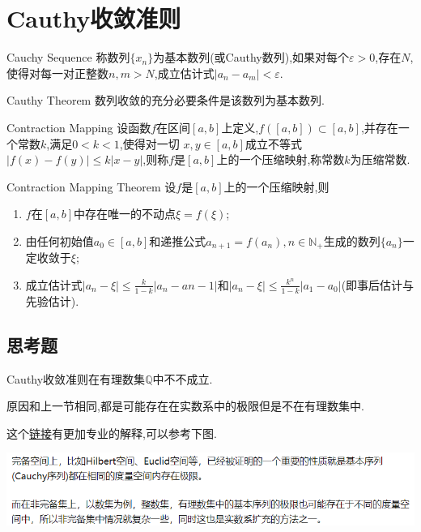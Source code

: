 
\section{Cauthy收敛准则}

 \begin{definition}[基本数列]{Cauchy Sequence}
     称数列$\{x_n\}$为基本数列(或Cauthy数列),如果对每个$\varepsilon>0$,存在$N$,使得对每一对正整数$n,m>N$,成立估计式$\lvert a_n-a_m\rvert<\varepsilon$.
 \end{definition}

 \begin{theorem}[Cauthy收敛准则]{Cauthy Theorem}
     数列收敛的充分必要条件是该数列为基本数列.
 \end{theorem}

 \begin{definition}[压缩映射]{Contraction Mapping}
     设函数$f$在区间$[a,b]$上定义,$f([a,b])\subset [a,b]$,并存在一个常数$k$,满足$0<k<1$,使得对一切 $x,y\in [a,b]$成立不等式$\lvert f(x)-f(y)\rvert\leqslant k\lvert x-y\rvert$,则称$f$是$[a,b]$上的一个压缩映射,称常数$k$为压缩常数.
 \end{definition}
 \begin{theorem}[压缩映射原理]{Contraction Mapping Theorem}
     设$f$是$[a,b]$上的一个压缩映射,则
     \begin{enumerate}
         \item $f$在$[a,b]$中存在唯一的不动点$\xi=f(\xi)$;
         \item 由任何初始值$a_0\in[a,b]$和递推公式$a_{n+1}=f(a_n),n\in \mathbb{N}_+$生成的数列$\{a_n\}$一定收敛于$\xi$;
         \item 成立估计式$\lvert a_n-\xi\rvert\leqslant\frac{k}{1-k}\lvert a_n-a{n-1}\rvert$和$\lvert a_n-\xi\rvert\leqslant\frac{k^n}{1-k}\lvert a_1-a_0\rvert$(即事后估计与先验估计).
     \end{enumerate}
 \end{theorem}
 \subsection{思考题}
     \begin{example}
         Cauthy收敛准则在有理数集$\mathbb{Q}$中不不成立.
     \end{example}
     \begin{solution}
         原因和上一节相同,都是可能存在在实数系中的极限但是不在有理数集中.

         这个\href{https://www.zhihu.com/question/50995932/answer/866173110}{链接}有更加专业的解释,可以参考下图.

         \includegraphics[width=0.8\linewidth]{Picture/3.4/Cauthy收敛准则在Q中不成立.png}
     \end{solution}

